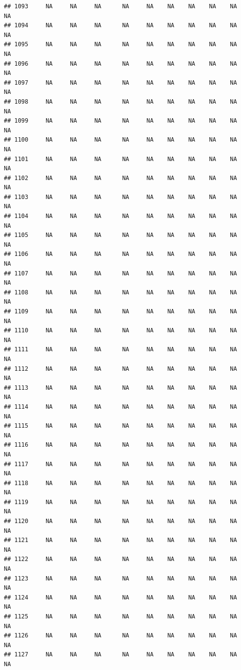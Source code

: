 \documentclass{article}\usepackage{graphicx, color}
\makeatletter
\newenvironment{kframe}{%
 \def\at@end@of@kframe{}%
 \ifinner\ifhmode%
  \def\at@end@of@kframe{\end{minipage}}%
  \begin{minipage}{\columnwidth}%
 \fi\fi%
 \def\FrameCommand##1{\hskip\@totalleftmargin \hskip-\fboxsep
 \colorbox{shadecolor}{##1}\hskip-\fboxsep
     \hskip-\linewidth \hskip-\@totalleftmargin \hskip\columnwidth}%
 \MakeFramed {\advance\hsize-\width
   \@totalleftmargin\z@ \linewidth\hsize
   \@setminipage}}%
 {\par\unskip\endMakeFramed%
 \at@end@of@kframe}
\newenvironment{knitrout}{}{} %
\makeatother
\begin{document}
\begin{knitrout}
\begin{kframe}
\begin{verbatim}
## 1093     NA     NA     NA      NA     NA    NA    NA    NA    NA     NA
## 1094     NA     NA     NA      NA     NA    NA    NA    NA    NA     NA
## 1095     NA     NA     NA      NA     NA    NA    NA    NA    NA     NA
## 1096     NA     NA     NA      NA     NA    NA    NA    NA    NA     NA
## 1097     NA     NA     NA      NA     NA    NA    NA    NA    NA     NA
## 1098     NA     NA     NA      NA     NA    NA    NA    NA    NA     NA
## 1099     NA     NA     NA      NA     NA    NA    NA    NA    NA     NA
## 1100     NA     NA     NA      NA     NA    NA    NA    NA    NA     NA
## 1101     NA     NA     NA      NA     NA    NA    NA    NA    NA     NA
## 1102     NA     NA     NA      NA     NA    NA    NA    NA    NA     NA
## 1103     NA     NA     NA      NA     NA    NA    NA    NA    NA     NA
## 1104     NA     NA     NA      NA     NA    NA    NA    NA    NA     NA
## 1105     NA     NA     NA      NA     NA    NA    NA    NA    NA     NA
## 1106     NA     NA     NA      NA     NA    NA    NA    NA    NA     NA
## 1107     NA     NA     NA      NA     NA    NA    NA    NA    NA     NA
## 1108     NA     NA     NA      NA     NA    NA    NA    NA    NA     NA
## 1109     NA     NA     NA      NA     NA    NA    NA    NA    NA     NA
## 1110     NA     NA     NA      NA     NA    NA    NA    NA    NA     NA
## 1111     NA     NA     NA      NA     NA    NA    NA    NA    NA     NA
## 1112     NA     NA     NA      NA     NA    NA    NA    NA    NA     NA
## 1113     NA     NA     NA      NA     NA    NA    NA    NA    NA     NA
## 1114     NA     NA     NA      NA     NA    NA    NA    NA    NA     NA
## 1115     NA     NA     NA      NA     NA    NA    NA    NA    NA     NA
## 1116     NA     NA     NA      NA     NA    NA    NA    NA    NA     NA
## 1117     NA     NA     NA      NA     NA    NA    NA    NA    NA     NA
## 1118     NA     NA     NA      NA     NA    NA    NA    NA    NA     NA
## 1119     NA     NA     NA      NA     NA    NA    NA    NA    NA     NA
## 1120     NA     NA     NA      NA     NA    NA    NA    NA    NA     NA
## 1121     NA     NA     NA      NA     NA    NA    NA    NA    NA     NA
## 1122     NA     NA     NA      NA     NA    NA    NA    NA    NA     NA
## 1123     NA     NA     NA      NA     NA    NA    NA    NA    NA     NA
## 1124     NA     NA     NA      NA     NA    NA    NA    NA    NA     NA
## 1125     NA     NA     NA      NA     NA    NA    NA    NA    NA     NA
## 1126     NA     NA     NA      NA     NA    NA    NA    NA    NA     NA
## 1127     NA     NA     NA      NA     NA    NA    NA    NA    NA     NA

\end{verbatim}
\end{kframe}
\end{knitrout}
\end{document}
